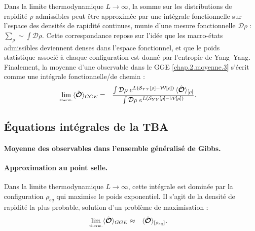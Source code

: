Dans la limite thermodynamique $L \to \infty$, la somme sur les distributions de rapidité $\rho$ admissibles peut être approximée par une intégrale fonctionnelle sur l’espace des densités de rapidité continues, munie d’une mesure fonctionnelle $\mathcal{D}\rho$ : 
\(
\sum_{\rho } \sim \int \mathcal{D} \rho .
\)
Cette correspondance repose sur l’idée que les macro-états admissibles deviennent denses dans l’espace fonctionnel, et que le poids statistique associé à chaque configuration est donné par l’entropie de Yang–Yang.
Finalement, la moyenne d'une observable dans le GGE \eqref{chap.2.moyenne.3} s’écrit comme une intégrale fonctionnelle/de chemin :
\begin{eqnarray}
	\underset{\mbox{\tiny therm.}}{\lim} \langle \hat{\bm{\mathcal{O}}} \rangle_{GGE} & = & \frac{\int \mathcal{D} \rho \; e^{L (\mathcal{S}_{YY}[\rho] - \mathcal{W}[\rho])} \, \langle\hat{\bm{\mathcal{O}}}\rangle_{[\rho]}}{\int \mathcal{D} \rho \; e^{L (\mathcal{S}_{YY}[\rho] - \mathcal{W}[\rho])}}. \label{chap:TBA:eq:ensemble_average}
\end{eqnarray}


%
\subsection{Équations intégrales de la TBA}

\paragraph{Moyenne des observables dans l’ensemble généralisé de Gibbs.}

\paragraph{Approximation au point selle.}

Dans la limite thermodynamique \( L \to \infty \), cette intégrale est dominée par la configuration \( \rho_{eq} \) qui maximise le poids exponentiel. Il s’agit de la densité de rapidité la plus probable, solution d’un problème de maximisation :
\begin{eqnarray}
	\underset{\mbox{\tiny therm.}}{\lim} \langle \hat{\bm{\mathcal{O}}} \rangle_{GGE} & \approx &  \langle\hat{\bm{\mathcal{O}}}\rangle_{[\rho_{eq} ]}.	
	\label{chap:TBA:eq:ensemble_average:approx}
\end{eqnarray}


